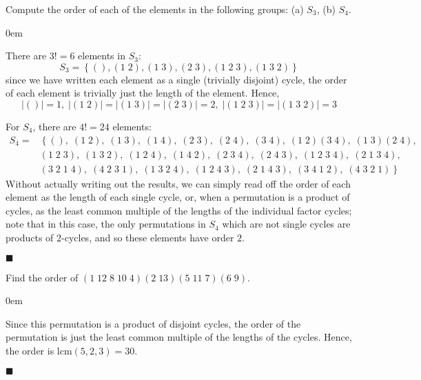 \documentclass[12pt]{article}
\renewcommand{\qed}{\hfill$\blacksquare$}
\renewenvironment{proof}{\begin{addmargin}[1em]{0em}\begin{newproof}}{\end{newproof}\end{addmargin}\qed}
\newenvironment{problem}[2][Exercise]{\begin{trivlist}
\item[\hskip \labelsep {\bfseries #1}\hskip \labelsep {\bfseries #2.}]}{\end{trivlist}}
\begin{document}
\begin{problem}{1.3.4}
Compute the order of each of the elements in the following groups: (a) $S_3$, (b) $S_4$.
\end{problem}
\begin{proof}
There are $3!=6$ elements in $S_3$: $$ S_3 = \left\{ \left(\right), \left(1\; 2\right), \left(1\; 3\right), \left(2\; 3\right), \left(1\;2\;3\right), \left(1\;3\;2\right) \right\} $$ since we have written each element as a single (trivially disjoint) cycle, the order of each element is trivially just the length of the element. Hence,
$$ \left|\left(\right)\right|=1, \; \left|\left(1\;2\right)\right|=\left|\left(1\;3\right)\right|=\left|\left(2\;3\right)\right|=2, \; \left|\left(1\;2\;3\right)\right|=\left|\left(1\;3\;2\right)\right|=3 $$

For $S_4$, there are $4!=24$ elements:
\begin{equation*}\begin{split}
    S_4 = & \left\{ \left(\right), \; \left(1\;2\right), \; \left(1\;3\right), \; \left(1\;4\right), \; \left(2 \; 3\right), \; \left(2\;4\right), \; \left(3\;4\right), \; \left(1\;2\right)\left(3\;4\right), \; \left(1\;3\right)\left(2\;4\right),  \right. \\
    & \left(1\;2\;3\right), \; \left(1\;3\;2\right), \; \left(1\;2\;4\right), \; \left(1\;4\;2\right), \; \left(2\;3\;4\right), \; \left(2\;4\;3\right), \; \left(1\;2\;3\;4\right), \; \left(2\;1\;3\;4\right), \\ & \left. \left(3\;2\;1\;4\right),\; \left(4\;2\;3\;1\right), \; \left(1\;3\;2\;4\right), \; \left(1\;2\;4\;3\right), \; \left(2\;1\;4\;3\right), \; \left(3\;4\;1\;2\right), \; \left(4\;3\;2\;1\right) \right\}
\end{split}\end{equation*}
Without actually writing out the results, we can simply read off the order of each element as the length of each single cycle, or, when a permutation is a product of cycles, as the least common multiple of the lengths of the individual factor cycles; note that in this case, the only permutations in $S_4$ which are not single cycles are products of 2-cycles, and so these elements have order $2$.
\end{proof}


\begin{problem}{1.3.5}
Find the order of $\left(1\;12\;8\;10\;4\right)\left(2\;13\right)\left(5\;11\;7\right)\left(6\;9\right)$.
\end{problem}
\begin{proof}
Since this permutation is a product of disjoint cycles, the order of the permutation is just the least common multiple of the lengths of the cycles. Hence, the order is $\text{lcm}\left(5,2,3\right) = 30$.
\end{proof}
\end{document}
